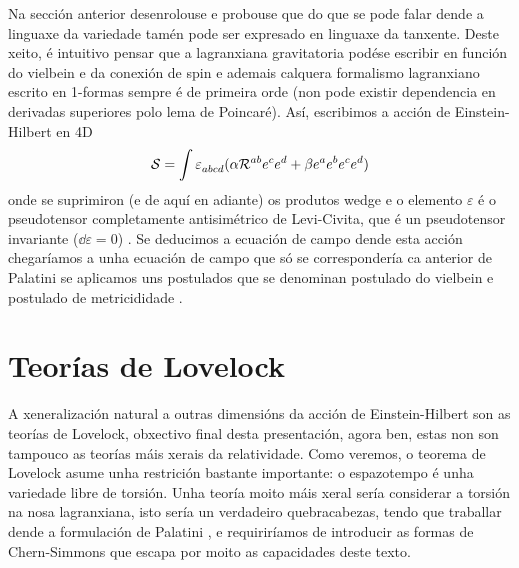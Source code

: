 Na sección anterior desenrolouse e probouse que do que se pode falar dende a linguaxe da variedade tamén pode ser expresado en linguaxe da tanxente. Deste xeito, é intuitivo pensar que a lagranxiana gravitatoria podése escribir en función do vielbein e da conexión de spin 
e ademais calquera formalismo lagranxiano escrito en 1-formas sempre é de primeira orde (non pode existir dependencia en derivadas superiores polo lema de Poincaré). Así, escribimos a acción de Einstein-Hilbert en 4D
\begin{align}
    \mathcal{S} = \int\varepsilon\indices{_a_b_c_d}(\alpha\mathcal{R}\indices{^a^b}e^ce^d + \beta e^ae^be^ce^d)
\end{align}
onde se suprimiron (e de aquí en adiante) os produtos wedge e o elemento $\varepsilon$ é o pseudotensor completamente antisimétrico de Levi-Civita, que é un pseudotensor invariante ($\dd\varepsilon=0$) \cite{CH_supergravities}. Se deducimos a ecuación de campo dende esta acción chegaríamos a unha ecuación de campo que só se correspondería ca anterior de Palatini se aplicamos uns postulados que se denominan postulado do vielbein e postulado de metricididade \cite{EinsteinsVielben}.

\section{Teorías de Lovelock}
A xeneralización natural a outras dimensións da acción de Einstein-Hilbert son as teorías de Lovelock, obxectivo final desta presentación, agora ben, estas non son tampouco as teorías máis xerais da relatividade. Como veremos, o teorema de Lovelock asume unha restrición bastante importante: o espazotempo é unha variedade libre de torsión. Unha teoría moito máis xeral sería considerar a torsión na nosa lagranxiana, isto sería un verdadeiro quebracabezas, tendo que traballar dende a formulación de Palatini \cite{Lovelock_metricformulation}, e requiriríamos de introducir as formas de Chern-Simmons \cite{CH_supergravities,Zanelli_2012} que escapa por moito as capacidades deste texto. 

\pagestyle{apaño1}
